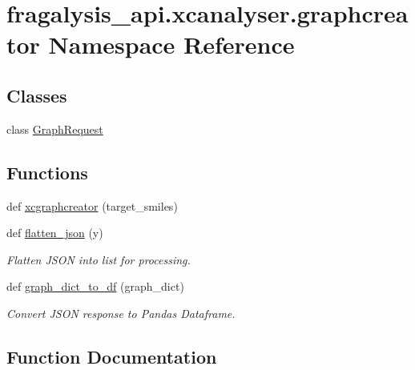 \hypertarget{namespacefragalysis__api_1_1xcanalyser_1_1graphcreator}{}\section{fragalysis\+\_\+api.\+xcanalyser.\+graphcreator Namespace Reference}
\label{namespacefragalysis__api_1_1xcanalyser_1_1graphcreator}
\subsection*{Classes}
\begin{DoxyCompactItemize}
\item 
class \hyperlink{classfragalysis__api_1_1xcanalyser_1_1graphcreator_1_1_graph_request}{Graph\+Request}
\end{DoxyCompactItemize}
\subsection*{Functions}
\begin{DoxyCompactItemize}
\item 
def \hyperlink{namespacefragalysis__api_1_1xcanalyser_1_1graphcreator_a028827844f85500b1fab4ff79cc7718c}{xcgraphcreator} (target\+\_\+smiles)
\item 
def \hyperlink{namespacefragalysis__api_1_1xcanalyser_1_1graphcreator_a1c41339aa422a66c6dc643086aa5bfbb}{flatten\+\_\+json} (y)
\begin{DoxyCompactList}\small\item\em Flatten J\+S\+ON into list for processing. \end{DoxyCompactList}\item 
def \hyperlink{namespacefragalysis__api_1_1xcanalyser_1_1graphcreator_a029a9d7dda209fb27d4268599330e8d3}{graph\+\_\+dict\+\_\+to\+\_\+df} (graph\+\_\+dict)
\begin{DoxyCompactList}\small\item\em Convert J\+S\+ON response to Pandas Dataframe. \end{DoxyCompactList}\end{DoxyCompactItemize}


\subsection{Function Documentation}
\mbox{\label{namespacefragalysis__api_1_1xcanalyser_1_1graphcreator_a1c41339aa422a66c6dc643086aa5bfbb}} 
